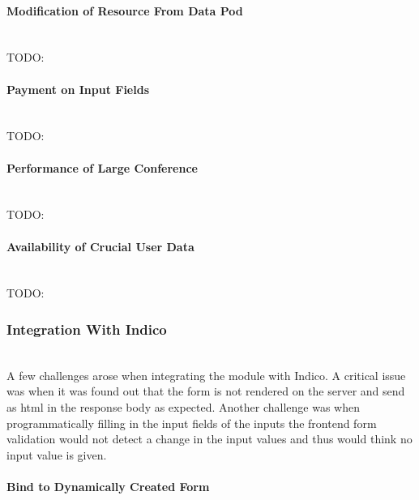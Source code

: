 \vspace{0.5cm}
\paragraph{Modification of Resource From Data Pod}\mbox{}\\

TODO:
\vspace{0.5cm}
\paragraph{Payment on Input Fields}\mbox{}\\

TODO:
\vspace{0.5cm}
\paragraph{Performance of Large Conference}\mbox{}\\

TODO:
\vspace{0.5cm}
\paragraph{Availability of Crucial User Data}\mbox{}\\

TODO:
\vspace{0.5cm}
\subsubsection{Integration With Indico}\mbox{}\\

A few challenges arose when integrating the module with Indico. A critical issue was when it was found out that the form is not rendered on the server and send as \gls{html} in the response body as expected. Another challenge was when programmatically filling in the input fields of the inputs the frontend form validation would not detect a change in the input values and thus would think no input value is given.

\vspace{0.5cm}
\paragraph{Bind to Dynamically Created Form}\mbox{}\\

